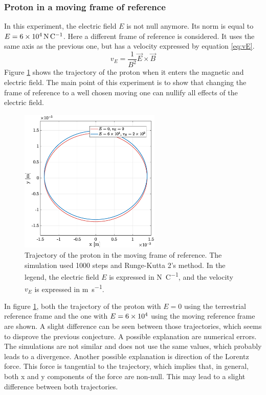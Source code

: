 \documentclass[a4paper,12pt,twoside]{article}
\begin{document}
\subsubsection{Proton in a moving frame of reference}
In this experiment, the electric field $E$ is not null anymore.
Its norm is equal to $E=\SI{6d4}{\newton\per\coulomb}$.
Here a different frame of reference is considered.
It uses the same axis as the previous one, but has a velocity expressed by equation \ref{eq:vE}.
\begin{equation}
	v_E = \frac{1}{B^2}\vec{E}\times\vec{B}
	\label{eq:vE}
\end{equation}%
Figure \ref{fig:app1_iii_traj} shows the trajectory of the proton when it enters the magnetic and electric field.
The main point of this experiment is to show that changing the frame of reference to a well chosen moving one can nullify all effects of the electric field.
\begin{figure}[h]
\centering
	\includegraphics[width=0.6\textwidth]{graphs/app1_iii_traj.eps}
	\caption{Trajectory of the proton in the moving frame of reference. The simulation used \num{1000} steps and Runge-Kutta 2's method. In the legend, the electric field $E$ is expressed in \si{\newton\per\coulomb}, and the velocity $v_E$ is expressed in \si{\meter\per\second}.}
	\label{fig:app1_iii_traj}
\end{figure}

In figure \ref{fig:app1_iii_traj}, both the trajectory of the proton with $E=0$ using the terrestrial reference frame and the one with $E=\num{6d4}$ using the moving reference frame are shown.
A slight difference can be seen between those trajectories, which seems to disprove the previous conjecture.
A possible explanation are numerical errors.
The simulations are not similar and does not use the same values, which probably leads to a divergence.
Another possible explanation is direction of the Lorentz force.
This force is tangential to the trajectory, which implies that, in general, both x and y components of the force are non-null.
This may lead to a slight difference between both trajectories.
\end{document}
